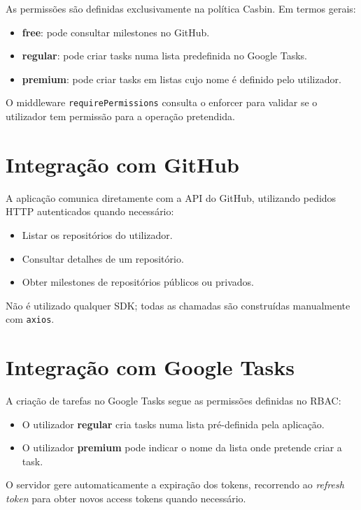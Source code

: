 As permissões são definidas exclusivamente na política Casbin. Em termos gerais:

\begin{itemize}
    \item \textbf{free}: pode consultar milestones no GitHub.
    \item \textbf{regular}: pode criar tasks numa lista predefinida no Google Tasks.
    \item \textbf{premium}: pode criar tasks em listas cujo nome é definido pelo utilizador.
\end{itemize}

O middleware \texttt{requirePermissions} consulta o enforcer para validar se o utilizador tem permissão para a operação pretendida.

\section{Integração com GitHub}

A aplicação comunica diretamente com a API do GitHub, utilizando pedidos HTTP autenticados quando necessário:

\begin{itemize}
    \item Listar os repositórios do utilizador.
    \item Consultar detalhes de um repositório.
    \item Obter milestones de repositórios públicos ou privados.
\end{itemize}

Não é utilizado qualquer SDK; todas as chamadas são construídas manualmente com \texttt{axios}.

\section{Integração com Google Tasks}

A criação de tarefas no Google Tasks segue as permissões definidas no RBAC:

\begin{itemize}
    \item O utilizador \textbf{regular} cria tasks numa lista pré-definida pela aplicação.
    \item O utilizador \textbf{premium} pode indicar o nome da lista onde pretende criar a task.
\end{itemize}

O servidor gere automaticamente a expiração dos tokens, recorrendo ao \textit{refresh token} para obter novos access tokens quando necessário.

